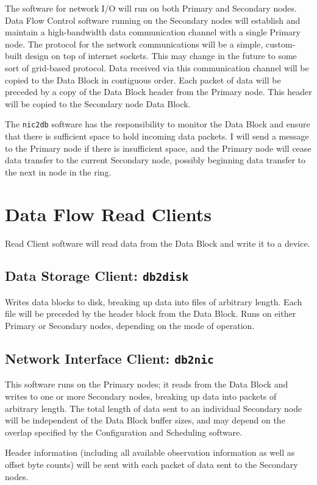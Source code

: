The software for network I/O will run on both Primary and Secondary
nodes.  Data Flow Control software running on the Secondary nodes will
establish and maintain a high-bandwidth data communication channel
with a single Primary node.  The protocol for the network
communications will be a simple, custom-built design on top of
internet sockets.  This may change in the future to some sort of
grid-based protocol.  Data received via this communication channel
will be copied to the Data Block in contiguous order.  Each packet of
data will be preceded by a copy of the Data Block header from the
Primary node.  This header will be copied to the Secondary node Data
Block.

The {\tt nic2db} software has the responsibility to monitor the Data
Block and ensure that there is sufficient space to hold incoming data
packets.  I will send a message to the Primary node if there is
insufficient space, and the Primary node will cease data transfer to
the current Secondary node, possibly beginning data transfer to the
next in node in the ring.

\newpage
\section{Data Flow Read Clients}

Read Client software will read data from the Data Block and write it
to a device.

\subsection{Data Storage Client: {\tt db2disk}}

Writes data blocks to disk, breaking up data into files of arbitrary
length.  Each file will be preceded by the header block from the Data
Block.  Runs on either Primary or Secondary nodes, depending on the
mode of operation.

\subsection{Network Interface Client: {\tt db2nic}}

This software runs on the Primary nodes; it reads from the Data Block
and writes to one or more Secondary nodes, breaking up data into
packets of arbitrary length.  The total length of data sent to an
individual Secondary node will be independent of the Data Block buffer
sizes, and may depend on the overlap specified by the Configuration
and Scheduling software.

Header information (including all available observation information as
well as offset byte counts) will be sent with each packet of data sent
to the Secondary nodes.
